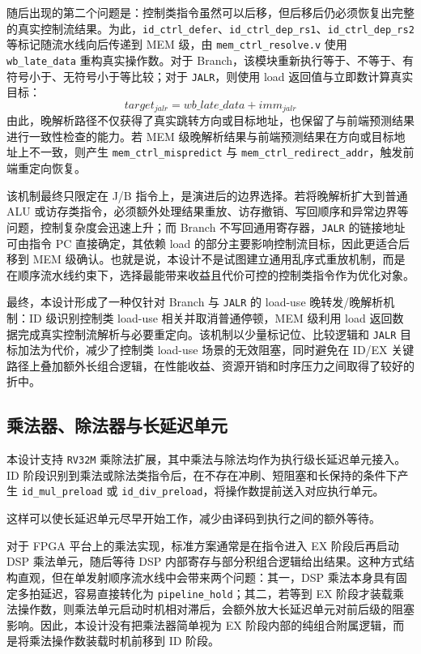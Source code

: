 ﻿\documentclass[12pt,a4paper]{ctexart}
\begin{document}
    随后出现的第二个问题是：控制类指令虽然可以后移，但后移后仍必须恢复出完整的真实控制流结果。为此，\texttt{id\_ctrl\_defer}、\texttt{id\_ctrl\_dep\_rs1}、\texttt{id\_ctrl\_dep\_rs2} 等标记随流水线向后传递到 MEM 级，由 \texttt{mem\_ctrl\_resolve.v} 使用 \texttt{wb\_late\_data} 重构真实操作数。对于 Branch，该模块重新执行等于、不等于、有符号小于、无符号小于等比较；对于 \texttt{JALR}，则使用 load 返回值与立即数计算真实目标：
    \[
        target_{jalr} = wb\_late\_data + imm_{jalr}
    \]
    由此，晚解析路径不仅获得了真实跳转方向或目标地址，也保留了与前端预测结果进行一致性检查的能力。若 MEM 级晚解析结果与前端预测结果在方向或目标地址上不一致，则产生 \texttt{mem\_ctrl\_mispredict} 与 \texttt{mem\_ctrl\_redirect\_addr}，触发前端重定向恢复。

    该机制最终只限定在 J/B 指令上，是演进后的边界选择。若将晚解析扩大到普通 ALU 或访存类指令，必须额外处理结果重放、访存撤销、写回顺序和异常边界等问题，控制复杂度会迅速上升；而 Branch 不写回通用寄存器，\texttt{JALR} 的链接地址可由指令 PC 直接确定，其依赖 load 的部分主要影响控制流目标，因此更适合后移到 MEM 级确认。也就是说，本设计不是试图建立通用乱序式重放机制，而是在顺序流水线约束下，选择最能带来收益且代价可控的控制类指令作为优化对象。

    最终，本设计形成了一种仅针对 Branch 与 \texttt{JALR} 的 load-use 晚转发/晚解析机制：ID 级识别控制类 load-use 相关并取消普通停顿，MEM 级利用 load 返回数据完成真实控制流解析与必要重定向。该机制以少量标记位、比较逻辑和 \texttt{JALR} 目标加法为代价，减少了控制类 load-use 场景的无效阻塞，同时避免在 ID/EX 关键路径上叠加额外长组合逻辑，在性能收益、资源开销和时序压力之间取得了较好的折中。

\subsection{乘法器、除法器与长延迟单元}
    本设计支持 \texttt{RV32M} 乘除法扩展，其中乘法与除法均作为执行级长延迟单元接入。ID 阶段识别到乘法或除法类指令后，在不存在冲刷、短阻塞和长保持的条件下产生 \texttt{id\_mul\_preload} 或 \texttt{id\_div\_preload}，将操作数提前送入对应执行单元。\par\indent
    这样可以使长延迟单元尽早开始工作，减少由译码到执行之间的额外等待。

    对于 FPGA 平台上的乘法实现，标准方案通常是在指令进入 EX 阶段后再启动 DSP 乘法单元，随后等待 DSP 内部寄存与部分积组合逻辑给出结果。这种方式结构直观，但在单发射顺序流水线中会带来两个问题：其一，DSP 乘法本身具有固定多拍延迟，容易直接转化为 \texttt{pipeline\_hold}；其二，若等到 EX 阶段才装载乘法操作数，则乘法单元启动时机相对滞后，会额外放大长延迟单元对前后级的阻塞影响。因此，本设计没有把乘法器简单视为 EX 阶段内部的纯组合附属逻辑，而是将乘法操作数装载时机前移到 ID 阶段。
\end{document}
